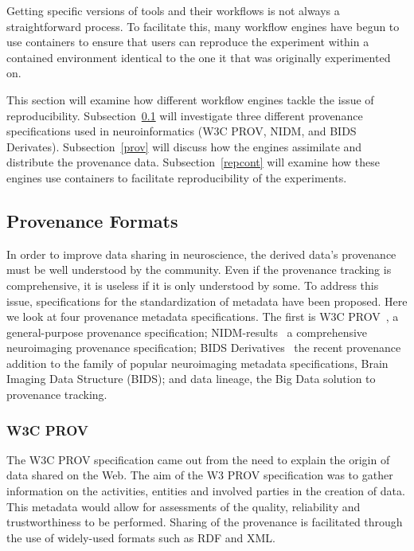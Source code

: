         Getting specific versions of tools and their workflows is not always a
        straightforward process. To facilitate this, many workflow engines have
        begun to use containers to ensure that users can reproduce the
        experiment within a contained environment identical to the one it that
        was originally experimented on. 

        This section will examine how different workflow engines tackle the
        issue of reproducibility. Subsection~\ref{metadata} will investigate three
        different provenance specifications used in neuroinformatics (W3C PROV,
        NIDM, and BIDS Derivates). Subsection~\ref{prov} will discuss how the
        engines assimilate and distribute the provenance data.
        Subsection~\ref{repcont} will examine how these engines use containers to
        facilitate reproducibility of the experiments. \subsection{Provenance
        Formats}\label{metadata} In order to improve data sharing in
        neuroscience, the derived data's provenance must be well understood by
        the community. Even if the provenance tracking is comprehensive, it is
        useless if it is only understood by some. To address this issue,
        specifications for the standardization of metadata have been proposed.
        Here we look at four provenance metadata specifications. The first is
        W3C PROV~\cite{missier2013w3c}, a general-purpose provenance
        specification; NIDM-results~\cite{Maumet:2016aa} a comprehensive
        neuroimaging provenance specification; BIDS Derivatives~\cite{bidsderiv}
        the recent provenance addition to the family of popular neuroimaging
        metadata specifications, Brain Imaging Data Structure (BIDS); and data
        lineage, the Big Data solution to provenance tracking.

            \subsubsection{W3C PROV}
            The W3C PROV specification came out from the need to explain the
            origin of data shared on the Web. The aim of the W3 PROV
            specification was to gather information on the activities, entities
            and involved parties in the creation of data. This metadata would
            allow for assessments of the quality, reliability and
            trustworthiness to be performed. Sharing of the provenance is
            facilitated through the use of widely-used formats such as RDF and
            XML. 

